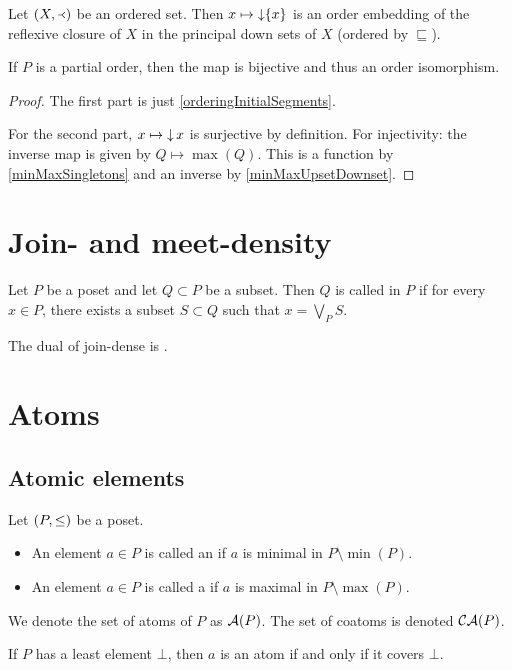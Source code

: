 \begin{proposition} \label{orderedSetPowerset}
Let $\left( X,\Yleft \right)$ be an ordered set. Then $x\mapsto \operatorname{\downarrow}\{x\}$ is an order embedding of the reflexive closure of $X$ in the principal down sets of $X$ (ordered by $\sqsubseteq$).

If $P$ is a partial order, then the map is bijective and thus an order isomorphism.
\end{proposition}
\begin{proof}
The first part is just \ref{orderingInitialSegments}.

For the second part, $x\mapsto \operatorname{\downarrow} x$ is surjective by definition. For injectivity: the inverse map is given by $Q\mapsto \max(Q)$. This is a function by \ref{minMaxSingletons} and an inverse by \ref{minMaxUpsetDownset}.
\end{proof}

\section{Join- and meet-density}
\begin{definition}
Let $P$ be a poset and let $Q\subset P$ be a subset. Then $Q$ is called  in $P$ if for every $x\in P$, there exists a subset $S\subset Q$ such that $x= \bigvee_P S$.

The dual of join-dense is .
\end{definition}

\section{Atoms}
\subsection{Atomic elements}
\begin{definition}
Let $\left( P,\leq \right)$ be a poset.
\begin{itemize}
\item An element $a\in P$ is called an  if $a$ is minimal in $P\setminus\min(P)$.
\item An element $a\in P$ is called a  if $a$ is maximal in $P\setminus\max(P)$.
\end{itemize}
We denote the set of atoms of $P$ as $\operatorname{\mathcal{A}}(P)$. The set of coatoms is denoted $\operatorname{\mathcal{CA}}(P)$.
\end{definition}
If $P$ has a least element $\bot$, then $a$ is an atom if and only if it covers $\bot$.



